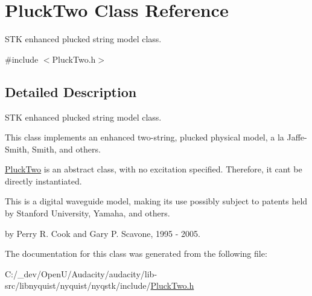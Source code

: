 \hypertarget{class_pluck_two}{}\section{Pluck\+Two Class Reference}
\label{class_pluck_two}


S\+TK enhanced plucked string model class.  




{\ttfamily \#include $<$Pluck\+Two.\+h$>$}



\subsection{Detailed Description}
S\+TK enhanced plucked string model class. 

This class implements an enhanced two-\/string, plucked physical model, a la Jaffe-\/\+Smith, Smith, and others.

\hyperlink{class_pluck_two}{Pluck\+Two} is an abstract class, with no excitation specified. Therefore, it can\textquotesingle{}t be directly instantiated.

This is a digital waveguide model, making its use possibly subject to patents held by Stanford University, Yamaha, and others.

by Perry R. Cook and Gary P. Scavone, 1995 -\/ 2005. 

The documentation for this class was generated from the following file\+:\begin{DoxyCompactItemize}
\item 
C\+:/\+\_\+dev/\+Open\+U/\+Audacity/audacity/lib-\/src/libnyquist/nyquist/nyqstk/include/\hyperlink{_pluck_two_8h}{Pluck\+Two.\+h}\end{DoxyCompactItemize}
